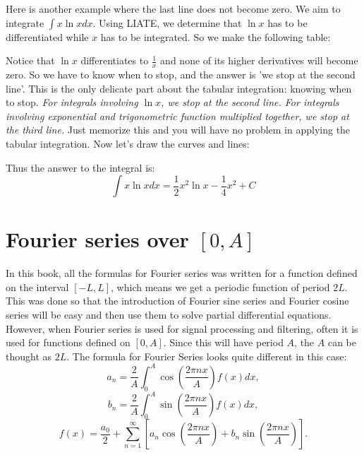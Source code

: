 \documentclass[12pt]{report}
\begin{document}
\begin{appendices}
	Here is another example where the last line does not become zero. We aim to integrate $\int x \ln x dx $. Using LIATE, we determine that $\ln x$ has to be differentiated while $x$ has to be integrated. So we make the following table:
	\begin{center}  \end{center}
	Notice that $\ln x$ differentiates to $\frac{1}{x}$ and none of its higher derivatives will become zero. So we have to know when to stop, and the answer is 'we stop at the second line'. This is the only delicate part about the tabular integration: knowing when to stop. \textit{For integrals involving $\ln x$, we stop at the second line. For integrals involving exponential and trigonometric function multiplied together, we stop at the third line. } Just memorize this and you will have no problem in applying the tabular integration.
	Now let's draw the curves and lines:
	\begin{center}  \end{center}
	Thus the answer to the integral is:
	$$\int x \ln x dx = \frac{1}{2} x^2 \ln x - \frac{1}{4} x^2 +C $$
	
	\chapter{Fourier series over $[0,A]$}
	
	In this book, all the formulas for Fourier series was written for a function defined on the interval $[-L,L]$, which means we get a periodic function of period $2L$. This was done so that the introduction of Fourier sine series and Fourier cosine series will be easy and then use them to solve partial differential equations. However, when Fourier series is used for signal processing and filtering, often it is used for functions defined on $[0,A]$. Since this will have period $A$, the $A$ can be thought as $2L$. The formula for Fourier Series looks quite different in this case:
	$$a_n = \frac{2}{A} \int_0^A \cos \left( \frac{2\pi n x}{A} \right) f(x) dx, $$
	$$b_n = \frac{2}{A} \int_0^A \sin \left( \frac{2\pi n x}{A} \right) f(x) dx, $$
	$$f(x) = \frac{a_0}{2} + \sum_{n=1}^{\infty} \left[ a_n \cos \left( \frac{2\pi n x}{A} \right) + b_n \sin \left( \frac{2\pi n x}{A} \right) \right]. $$
	

\end{appendices}
\end{document}
